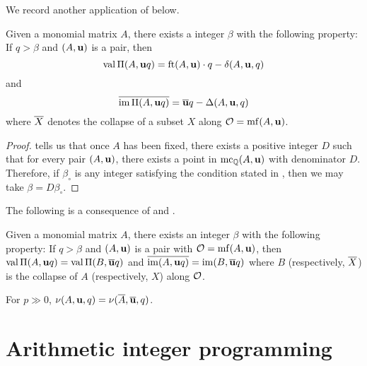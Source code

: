 \documentclass[11pt]{amsart}
\begin{document}
We record another application of  below.

\begin{theorem}
\label{uniform uniform value and image: T}
Given a monomial matrix $A$, there exists a integer $\beta$ with the following property:  If $q > \beta$ and $(A, \mathbf{u})$ is a pair, then \[ \operatorname{val} \Pi(A, \mathbf{u}q) = \operatorname{ft}(A, \mathbf{u}) \cdot q - \delta(A, \mathbf{u}, q) \] and
\[ \overline{ \operatorname{im} \Pi(A, \mathbf{u}q)} = \overline{\mathbf{u}}q - \Delta(A, \mathbf{u},q) \] where $\overline{X}$ denotes the collapse of a subset $X$ along $\mathcal{O} = \operatorname{mf}(A, \mathbf{u})$.
\end{theorem}

\begin{proof}  
  tells us that once $A$ has been fixed, there exists a positive integer $D$ such that for every pair $(A, \mathbf{u})$, there exists a point in $\operatorname{mc}_{\mathbb{Q}}(A, \mathbf{u})$ with denominator $D$.  Therefore, if $\beta_{\circ}$  is any integer satisfying the condition stated in , then we may take $\beta = D \beta_{\circ}$.  
\end{proof}

The following is a consequence of  and .

\begin{corollary}
Given a monomial matrix $A$, there exists an integer $\beta$ with the following property\textup:  If $q > \beta$ and $(A, \mathbf{u})$ is a pair with $\mathcal{O} = \operatorname{mf}(A, \mathbf{u})$, then $\operatorname{val} \Pi(A, \mathbf{u}q) = \operatorname{val} \Pi(B, \overline{\mathbf{u}}q)$ and $\overline{ \operatorname{im}(A, \mathbf{u}q)} = \operatorname{im}(B, \overline{\mathbf{u}}q)$ where $B$ (respectively, $\overline{X}$) is the collapse of $A$  (respectively, $X$) along $\mathcal{O}$.
\end{corollary}


\begin{corollary}
For $p \gg 0$, 
 $\nu(A, \mathbf{u}, q) = \nu(\overline{A}, \overline{\mathbf{u}}, q)$. 
\end{corollary}


\newpage




\newpage


\section{Arithmetic integer programming}
\end{document}
